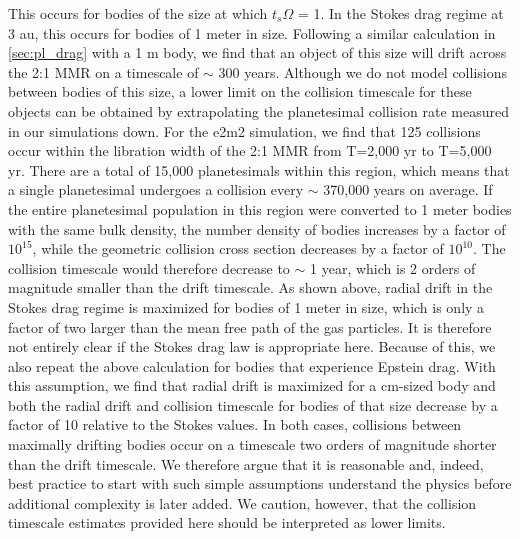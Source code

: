 \documentclass[fleqn,usenatbib]{mnras}
\begin{document}
This occurs for bodies of the size at which $t_{s} \Omega$ = 1. In the Stokes drag regime at 3 au, this occurs for bodies of 1 meter in size. Following a similar 
calculation in \ref{sec:pl_drag} with a 1 m body, we find that an object of this size will drift across the 2:1 MMR on a timescale of $\sim$ 300 years. Although we do not model collisions 
between bodies of this size, a lower limit on the collision timescale for these objects can be obtained by extrapolating the planetesimal collision rate measured in our simulations down. For 
the e2m2 simulation, we find that 125 collisions occur within the libration width of the 2:1 MMR from T=2,000 yr to  T=5,000 yr. There are a total of 15,000 planetesimals within this region, 
which means that a single planetesimal undergoes a collision every $\sim$ 370,000 years on average. If the entire planetesimal population in this region were converted to 1 meter bodies 
with the same bulk density, the number density of bodies increases by a factor of $10^{15}$, while the geometric collision cross section decreases by a factor of $10^{10}$. The collision 
timescale would therefore decrease to $\sim$ 1 year, which is 2 orders of magnitude smaller than the drift timescale. As shown above, radial drift in the Stokes drag regime is maximized 
for bodies of 1 meter in size, which is only a factor of two larger than the mean free path of the gas particles. It is therefore not entirely clear if the Stokes drag law is appropriate here. 
Because of this, we also repeat the above calculation for bodies that experience Epstein drag. With this assumption, we find that radial drift is maximized for a cm-sized body and both the 
radial drift and collision timescale for bodies of that size decrease by a factor of 10 relative to the Stokes values. In both cases, collisions between maximally drifting bodies occur on a 
timescale two orders of magnitude shorter than the drift timescale. We therefore argue that it is reasonable and, indeed, best practice to start with such simple assumptions understand the 
physics before additional complexity is later added. We caution, however, that the collision timescale estimates provided here should be interpreted as lower limits.
\end{document}
